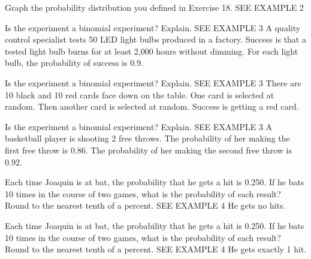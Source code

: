 \documentclass{article}
\newenvironment{practice}[2]{}{}        %
\newcommand{\answer}[1]{}               %
\newcommand{\placeholder}[2]{}          %
\begin{document}
\begin{practice}{19}{1}
Graph the probability distribution you defined in Exercise 18. SEE EXAMPLE 2
\answer{See graph.}
\placeholder{graph}{Practice 19 answer: adjacent orange black-bordered bars at Score 0,1,2,3,4, heights .1,7/30,.3,.2,1/6. Vertical Probability 0.0-.5 by .1. Pale background and dotted grid, no arrows.}
\end{practice}
\begin{practice}{20}{2}
Is the experiment a binomial experiment? Explain. SEE EXAMPLE 3
A quality control specialist tests 50 LED light bulbs produced in a factory. Success is that a tested light bulb burns for at least 2,000 hours without dimming. For each light bulb, the probability of success is 0.9.
\answer{Yes; each of the 50 trials has two possible outcomes, success and not success; the performance of one bulb does not affect the performance of another, so the trials are independent; the probability of success, 0.9, is the same for each trial.}
\end{practice}
\begin{practice}{21}{2}
Is the experiment a binomial experiment? Explain. SEE EXAMPLE 3
There are 10 black and 10 red cards face down on the table. One card is selected at random. Then another card is selected at random. Success is getting a red card.
\answer{No; the selection results are not independent. Since the first card is not returned, the sample space for the next selection differs, so the probability changes.}
\end{practice}
\begin{practice}{22}{2}
Is the experiment a binomial experiment? Explain. SEE EXAMPLE 3
A basketball player is shooting 2 free throws. The probability of her making the first free throw is 0.86. The probability of her making the second free throw is 0.92.
\answer{No; the probability of making the free throws is not the same for each trial.}
\end{practice}
\begin{practice}{23}{1}
Each time Joaquin is at bat, the probability that he gets a hit is 0.250. If he bats 10 times in the course of two games, what is the probability of each result? Round to the nearest tenth of a percent. SEE EXAMPLE 4
He gets no hits.
\answer{5.6\%}
\end{practice}
\begin{practice}{24}{1}
Each time Joaquin is at bat, the probability that he gets a hit is 0.250. If he bats 10 times in the course of two games, what is the probability of each result? Round to the nearest tenth of a percent. SEE EXAMPLE 4
He gets exactly 1 hit.
\answer{18.8\%}
\end{practice}
\end{document}
